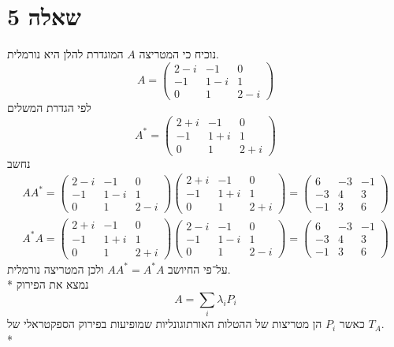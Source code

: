 \section{שאלה 5}
נוכיח כי המטריצה $A$ המוגדרת להלן היא נורמלית.
\[
	A = \begin{pmatrix}
		2 - i & -1 & 0 \\
		-1 & 1 - i & 1 \\
		0 & 1 & 2 - i
	\end{pmatrix}
\]
לפי הגדרת המשלים
\[
	A^* = \begin{pmatrix}
		2 + i & -1 & 0 \\
		-1 & 1 + i & 1 \\
		0 & 1 & 2 + i
	\end{pmatrix}
\]
נחשב
\begin{align*}
	A A^* = 
	\begin{pmatrix}
		2 - i & -1 & 0 \\
		-1 & 1 - i & 1 \\
		0 & 1 & 2 - i
	\end{pmatrix}
	\begin{pmatrix}
		2 + i & -1 & 0 \\
		-1 & 1 + i & 1 \\
		0 & 1 & 2 + i
	\end{pmatrix}
	= \begin{pmatrix}
		6 & -3 & -1 \\
		-3 & 4 & 3 \\
		-1 & 3 & 6
	\end{pmatrix} \\
	A^* A = 
	\begin{pmatrix}
		2 + i & -1 & 0 \\
		-1 & 1 + i & 1 \\
		0 & 1 & 2 + i
	\end{pmatrix}
	\begin{pmatrix}
		2 - i & -1 & 0 \\
		-1 & 1 - i & 1 \\
		0 & 1 & 2 - i
	\end{pmatrix}
	= \begin{pmatrix}
		6 & -3 & -1 \\
		-3 & 4 & 3 \\
		-1 & 3 & 6
	\end{pmatrix}
\end{align*}
על־פי החיושב $A A^* = A^* A$ ולכן המטריצה נורמלית. \\*
נמצא את הפירוק
\[
	A = \sum_{i} \lambda_i P_i
\]
כאשר $P_i$ הן מטריצות של ההטלות האורתוגונליות שמופיעות בפירוק הספקטראלי של $T_A$. \\*
